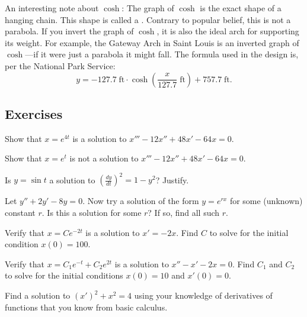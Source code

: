 An interesting note about $\cosh$:  The graph of $\cosh$ is the exact shape
of a hanging chain.  This shape is called
a \emph{}.
Contrary to popular belief, this is not a
parabola.  If you invert the graph of $\cosh$, it is also the ideal arch for
supporting its weight.
For example, the Gateway Arch in Saint Louis is an inverted graph of
$\cosh$---if it were just a parabola it might fall.  The formula
used in the design is,
per the National Park Service:
\begin{equation*}
y = -127.7 \; \textrm{ft} \cdot \cosh\left(\frac{x}{127.7}  \;
\textrm{ft}\right) + 757.7 \; \textrm{ft} .
\end{equation*}


\subsection{Exercises}

\begin{exercise}
Show that $x = e^{4t}$ is a solution to $x'''-12 x'' + 48 x' - 64 x = 0$.
\end{exercise}

\begin{exercise}
Show that $x = e^{t}$ is not a solution to $x'''-12 x'' + 48 x' - 64 x = 0$.
\end{exercise}

\begin{exercise}
Is $y = \sin t$ a solution to ${\left( \frac{dy}{dt} \right)}^2 = 1 - y^2$?
Justify.
\end{exercise}

\begin{exercise}
Let $y'' + 2y' - 8y = 0$.  Now try a solution of the form $y = e^{rx}$ for
some (unknown) constant $r$.  Is this a solution
for some $r$?  If so, find all such $r$.
\end{exercise}

\begin{exercise}
Verify that $x = C e^{-2t}$ is a solution to $x' = -2x$.
Find $C$ to solve for the initial condition $x(0) = 100$.
\end{exercise}

\begin{exercise}
Verify that $x = C_1 e^{-t} + C_2 e^{2t}$ is a solution to $x'' - x' -2 x =
0$.  Find $C_1$ and $C_2$ to solve for the initial conditions $x(0) = 10$
and $x'(0) = 0$.
\end{exercise}

\begin{exercise}
Find a solution to
${(x')}^2 + x^2 = 4$
using your knowledge of derivatives of functions that you
know from basic calculus.
\end{exercise}

